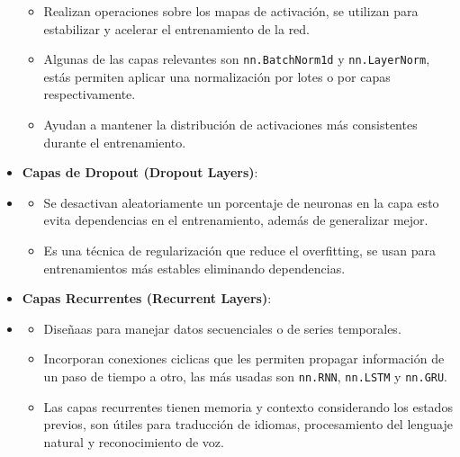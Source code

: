 \begin{itemize}
          \begin{itemize}
              \item Realizan operaciones sobre los mapas de activación, se utilizan para estabilizar y acelerar el entrenamiento de la red.
              \item Algunas de las capas relevantes son \texttt{nn.BatchNorm1d} y \texttt{nn.LayerNorm}, estás permiten aplicar una normalización por lotes o por capas respectivamente.
              \item Ayudan a mantener la distribución de activaciones más consistentes durante el entrenamiento.
          \end{itemize}
    \item \textbf{Capas de Dropout (Dropout Layers)}: %
    \item[]
          \begin{itemize}
              \item Se desactivan aleatoriamente un porcentaje de neuronas en la capa esto evita dependencias en el entrenamiento, además de generalizar mejor.
              \item Es una técnica de regularización que reduce el {overfitting}, se usan para entrenamientos más estables eliminando dependencias.
          \end{itemize}
    \item \textbf{Capas Recurrentes (Recurrent Layers)}: %
    \item[]
          \begin{itemize}
              \item Diseñaas para manejar datos secuenciales o de series temporales.
              \item Incorporan conexiones ciclicas que les permiten propagar información de un paso de tiempo a otro, las más usadas son \texttt{nn.RNN}, \texttt{nn.LSTM} y \texttt{nn.GRU}.
              \item Las capas recurrentes tienen memoria y contexto considerando los estados previos, son útiles para traducción de idiomas, procesamiento del lenguaje natural y reconocimiento de voz.
          \end{itemize}
\end{itemize}


